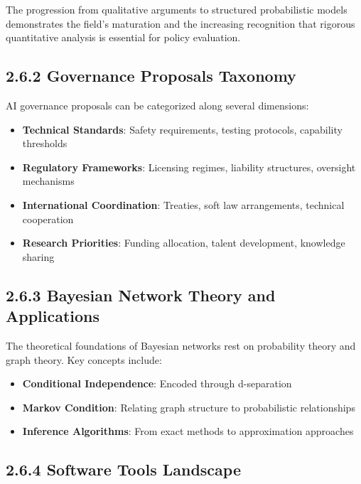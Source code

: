 \documentclass[
  11pt,
  letterpaper,
]{book}
\providecommand{\tightlist}{%
  \setlength{\itemsep}{0pt}\setlength{\parskip}{0pt}}
\begin{document}
The progression from qualitative arguments to structured probabilistic
models demonstrates the field's maturation and the increasing
recognition that rigorous quantitative analysis is essential for policy
evaluation.

\subsection*{2.6.2 Governance Proposals
Taxonomy}\label{sec-governance-taxonomy}

AI governance proposals can be categorized along several dimensions:

\begin{itemize}
\tightlist
\item
  \textbf{Technical Standards}: Safety requirements, testing protocols,
  capability thresholds
\item
  \textbf{Regulatory Frameworks}: Licensing regimes, liability
  structures, oversight mechanisms
\item
  \textbf{International Coordination}: Treaties, soft law arrangements,
  technical cooperation
\item
  \textbf{Research Priorities}: Funding allocation, talent development,
  knowledge sharing
\end{itemize}

\subsection*{2.6.3 Bayesian Network Theory and
Applications}\label{sec-bn-theory}

The theoretical foundations of Bayesian networks rest on probability
theory and graph theory. Key concepts include:

\begin{itemize}
\tightlist
\item
  \textbf{Conditional Independence}: Encoded through d-separation
\item
  \textbf{Markov Condition}: Relating graph structure to probabilistic
  relationships
\item
  \textbf{Inference Algorithms}: From exact methods to approximation
  approaches
\end{itemize}

\subsection*{2.6.4 Software Tools Landscape}\label{sec-software-tools}
\end{document}

